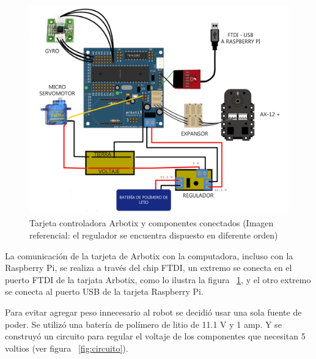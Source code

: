 \begin{figure}[hbtp]
\centering
\includegraphics[scale=0.2]{imagenes/arbotix_componentes1.jpg}
\caption{Tarjeta controladora Arbotix y componentes conectados (Imagen referencial: el regulador se encuentra dispuesto en diferente orden)}
\label{fig:arbotixConectados}
\end{figure}

La comunicación de la tarjeta de Arbotix con la computadora, incluso con la Raspberry Pi, se realiza a través del chip FTDI, un extremo se conecta en el puerto FTDI de la tarjata Arbotix, como lo ilustra la figura ~\ref{fig:arbotixConectados}, y el otro extremo se conecta al puerto \gls{USB} de la tarjeta Raspberry Pi.

Para evitar agregar peso innecesario al robot se decidi\'o usar una sola fuente de poder. Se utilizó una batería de polímero de litio de 11.1 V y 1 amp. Y se construyó un circuito para regular el voltaje de los componentes que necesitan 5 voltios (ver figura ~\ref{fig:circuito}).



